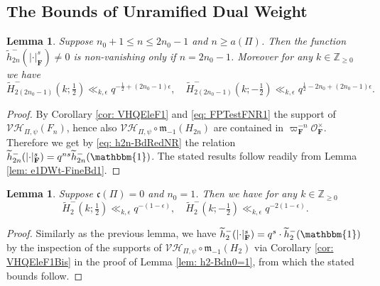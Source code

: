 \documentclass[A4]{amsart}
\def\leq{\leqslant}
\def\geq{\geqslant}
\newtheorem{lemma}      [theorem]{Lemma}
\numberwithin{equation}{section} \everymath{\displaystyle}
\newcommand{\Z}{\mathbb{Z}}
\newcommand{\id}{\mathbbm{1}}
\newcommand{\F}{\mathbf{F}}
\newcommand{\vO}{\mathcal{O}}
\newcommand{\norm}[1][\cdot]{\lvert #1 \rvert}
\newcommand{\Mult}{\mathfrak{m}}
\newcommand{\VorH}{\mathcal{VH}}
\newcommand{\cond}{\mathfrak{c}}
\begin{document}
	\subsection{The Bounds of Unramified Dual Weight}
	
\begin{lemma} \label{lem: e1DNDWt-FineBd1}
	Suppose $n_0 + 1 \leq n \leq 2n_0 - 1$ and $n \geq a(\Pi)$. Then the function $\widetilde{h}_{2n}^-(\norm_{\F}^s) \neq 0$ is non-vanishing only if $n=2n_0-1$. Moreover for any $k \in \Z_{\geq 0}$ we have
	$$ \widetilde{H}_{2(2n_0-1)}^-(k; \tfrac{1}{2}) \ll_{k,\epsilon} q^{-\frac{1}{2}+ \left( 2n_0-1 \right) \epsilon}, \quad \widetilde{H}_{2(2n_0-1)}^-(k; -\tfrac{1}{2}) \ll_{k,\epsilon} q^{\frac{1}{2}-2n_0+\left( 2n_0-1 \right) \epsilon}. $$
\end{lemma}
\begin{proof}
	By Corollary \ref{cor: VHQEleF1} and \eqref{eq: FPTestFNR1} the support of $\VorH_{\Pi,\psi}(F_n)$, hence also $\VorH_{\Pi,\psi} \circ \Mult_{-1} (H_{2n})$ are contained in $\varpi_{\F}^{-n} \vO_{\F}^{\times}$. Therefore we get by \eqref{eq: h2n-BdRedNR} the relation $\widetilde{h}_{2n}^-(\norm_{\F}^s) = q^{ns} \widetilde{h}_{2n}^-(\id)$. The stated results follow readily from Lemma \ref{lem: e1DWt-FineBd1}.
\end{proof}

\begin{lemma} \label{lem: h2-DNBdn0=1}
	Suppose $\cond(\Pi)=0$ and $n_0=1$. Then we have for any $k \in \Z_{\geq 0}$
	$$ \widetilde{H}_{2}^-(k; \tfrac{1}{2}) \ll_{k,\epsilon} q^{-(1-\epsilon)}, \quad \widetilde{H}_{2}^-(k; -\tfrac{1}{2}) \ll_{k,\epsilon} q^{-2(1-\epsilon)}. $$
\end{lemma}
\begin{proof}
	Similarly as the previous lemma, we have $\widetilde{h}_2^-(\norm_{\F}^s) = q^s \cdot \widetilde{h}_2^-(\id)$ by the inspection of the supports of $\VorH_{\Pi,\psi} \circ \Mult_{-1}(H_2)$ via Corollary \ref{cor: VHQEleF1Bis} in the proof of Lemma \ref{lem: h2-Bdn0=1}, from which the stated bounds follow.
\end{proof}
\end{document}

